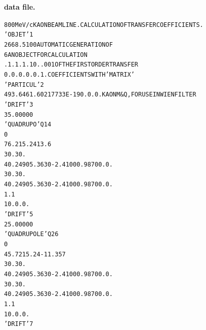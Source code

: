 \begin{tiny}

\twocolumn
\noindent \textbf{\normalsize  \zgoubi data file.}
\begin{alltt}
    800 MeV/c KAON BEAM LINE. CALCULATION OF TRANSFER COEFFICIENTS.             
   'OBJET'                                                                 1
   2668.5100                             AUTOMATIC  GENERATION  OF              
   6                                     AN  OBJECT  FOR  CALCULATION           
   .1  .1  .1  .1 0.  .001      OF  THE  FIRST  ORDER  TRANSFER                 
   0. 0. 0. 0. 0. 1.                     COEFFICIENTS  WITH  'MATRIX'           
   'PARTICUL'                                                              2
    493.646 1.60217733E-19 0. 0. 0.      KAON M & Q, FOR USE IN WIEN FILTER     
   'DRIFT'                                                                 3
    35.00000                                                                    
   'QUADRUPO'                            Q1                                4
   0                                                        
     76.2  15.24  13.6                                                          
    30.  30.                                                                    
    4    0.2490   5.3630  -2.4100   0.9870   0.   0.                            
    30. 30.                                                                     
    4    0.2490   5.3630  -2.4100   0.9870   0.   0.                            
     1.1                                                                        
    1  0. 0. 0.                                                                 
   'DRIFT'                                                                 5
     25.00000                                                                   
   'QUADRUPOLE'                          Q2                                6
   0                                                        
   45.72  15.24   -11.357                                                       
    30. 30.                                                                     
    4    0.2490   5.3630  -2.4100   0.9870   0.   0.                            
    30. 30.                                                                     
    4    0.2490   5.3630  -2.4100   0.9870   0.   0.                            
     1.1                                                                        
    1  0. 0. 0.                                                                 
   'DRIFT'                                                                 7

\end{alltt}
\end{tiny}

